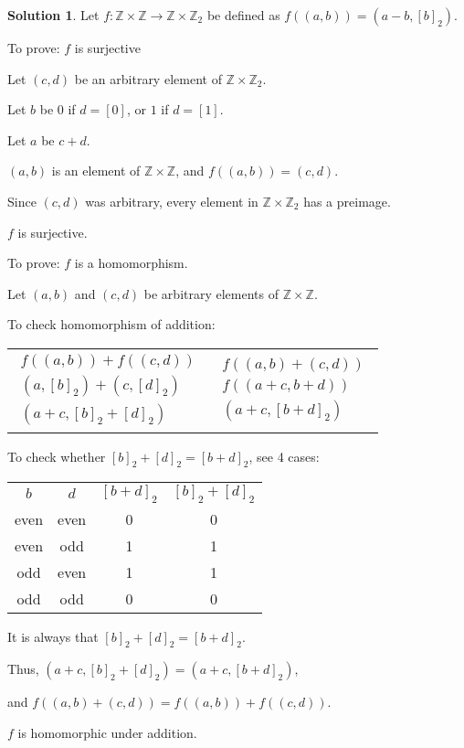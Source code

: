 \documentclass[12pt]{article}
\theoremstyle{definition}
\newtheorem*{soln}{Solution}
\newcommand{\ZZ}{{\mathbb{Z}}}
\begin{document}
\begin{soln}\quad

Let $f:\ZZ \times \ZZ \to \ZZ \times \ZZ_2$ be defined as
$f ((a, b)) = (a - b, [b]_2)$.

To prove: $f$ is surjective

Let $(c, d)$ be an arbitrary element of $\ZZ\times\ZZ_2$.

Let $b$ be $0$ if $d=[0]$, or $1$ if $d=[1]$.

Let $a$ be $c+d$.

$(a, b)$ is an element of $\ZZ\times\ZZ$, and $f((a,b))=(c,d)$.

Since $(c, d)$ was arbitrary, every element in $\ZZ\times\ZZ_2$ has a preimage.

$f$ is surjective.

To prove: $f$ is a homomorphism.

Let $(a, b)$ and $(c, d)$ be arbitrary elements of $\ZZ\times\ZZ$.

To check homomorphism of addition:

\begin{center}
\begin{tabular}{c|c}
$\begin{gathered}
f((a,b))+f((c,d))\\
(a,[b]_2)+(c,[d]_2)\\
(a+c,[b]_2+[d]_2)
\end{gathered}$
&
$\begin{gathered}
f((a,b)+(c,d))\\
f((a+c,b+d))\\
(a+c,[b+d]_2)
\end{gathered}$
\end{tabular}

To check whether $[b]_2+[d]_2=[b+d]_2$, see 4 cases:

\begin{tabular}{c c c c}
$b$ & $d$ & $[b+d]_2$ & $[b]_2+[d]_2$ \\
even & even & 0 & 0\\
even & odd & 1 & 1\\
odd & even & 1 & 1\\
odd & odd & 0 & 0
\end{tabular}

It is always that $[b]_2+[d]_2=[b+d]_2$.

Thus, $(a+c,[b]_2+[d]_2)=(a+c,[b+d]_2)$,

and $f((a,b)+(c,d))=f((a,b))+f((c,d))$.

$f$ is homomorphic under addition.
\end{center}


\end{soln}
\end{document}

